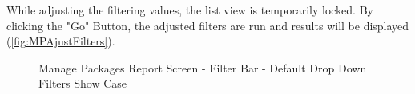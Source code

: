 While adjusting the filtering values, the list view is temporarily locked. By clicking the "Go" Button, the adjusted filters are run and results will be displayed (\autoref{fig:MPAjustFilters}).


\begin{figure}[H]
	\centering
	\hspace{5pt}

	\caption{Manage Packages Report Screen - Filter Bar - Default Drop Down Filters Show Case}
	\label{fig:MPDefaultDropDown}
\end{figure}

